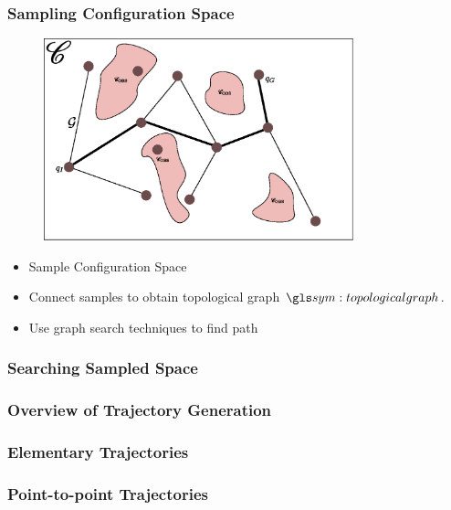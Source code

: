 \documentclass{beamer}
\begin{document}
	\begin{frame}
		\frametitle{Sampling Configuration Space}
		\begin{figure}
			\includegraphics[width=0.8\textwidth]{sampling_methods}
		\end{figure}

		\begin{itemize}
			\item

				Sample Configuration Space

			\item

				Connect samples to obtain topological graph $\topologicalgraph$.

			\item

				Use graph search techniques to find path
		\end{itemize}
	\end{frame}

	\begin{frame}
		\frametitle{Searching Sampled Space}
	\end{frame}

	\begin{frame}
		\frametitle{Overview of Trajectory Generation}
	\end{frame}

	\begin{frame}
		\frametitle{Elementary Trajectories}
	\end{frame}

	\begin{frame}
		\frametitle{Point-to-point Trajectories}
	\end{frame}
\end{document}

